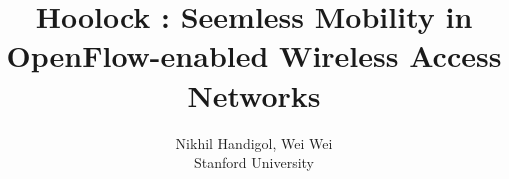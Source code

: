 \documentclass[times, conference, 10pt, onecolumn]{IEEEtran}
\begin{document}
\title{Hoolock : Seemless Mobility in OpenFlow-enabled Wireless Access Networks}

\author{Nikhil Handigol, Wei Wei\\
Stanford University\\
}

\maketitle
\thispagestyle{empty}








%


\end{document}
